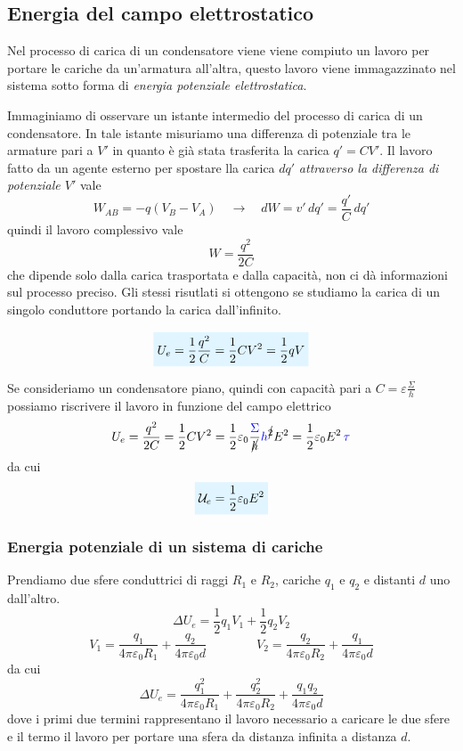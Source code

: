 \documentclass[x11names]{report}
\newcommand{\viola}[1]{%
	\colorbox{myblue}{$\displaystyle #1$}
}
\begin{document}
\subsection{Energia del campo elettrostatico}
Nel processo di carica di un condensatore viene viene compiuto un lavoro per portare le cariche da un'armatura all'altra, questo lavoro viene immagazzinato nel sistema sotto forma di \textit{energia potenziale elettrostatica}.

Immaginiamo di osservare un istante intermedio del processo di carica di un condensatore. In tale istante misuriamo una differenza di potenziale tra le armature pari a \(V'\) in quanto è già stata trasferita la carica \(q' = CV'\). Il lavoro fatto da un agente esterno per spostare lla carica \(dq'\) \textit{attraverso la differenza di potenziale \(V'\)} vale
\[
W_{AB} = -q(V_B-V_A) \quad \to \quad dW = v'\, dq' = \frac{q'}{C}\, dq'
\]
quindi il lavoro complessivo vale
\[
W = \frac{q^2}{2C}
\]
che dipende solo dalla carica trasportata e dalla capacità, non ci dà informazioni sul processo preciso. Gli stessi risutlati si ottengono se studiamo la carica di un singolo conduttore portando la carica dall'infinito.

\begin{equation}
	\viola{U_e = \frac{1}{2}\frac{q^2}{C} = \frac{1}{2}CV^2 = \frac{1}{2}qV}
\end{equation}

Se consideriamo un condensatore piano, quindi con capacità pari a \(C=\varepsilon\frac{\Sigma}{h}\) possiamo riscrivere il lavoro in funzione del campo elettrico
\[
U_e = \frac{q^2}{2C}  = \frac{1}{2}CV^2 =  \frac{1}{2}\varepsilon_0\frac{\textcolor{blue}{\Sigma}}{\cancel{h}}\textcolor{blue}{h}^{\cancel{2}}E^2 = \frac{1}{2}\varepsilon_0 E^2 \, \textcolor{blue}{\tau}
\]
da cui
\begin{equation}
	\viola{\mathcal{U}_e = \frac{1}{2}\varepsilon_0 E^2}
\end{equation}

\subsubsection{Energia potenziale di un sistema di cariche}
Prendiamo due sfere conduttrici di raggi \(R_1\) e \(R_2\), cariche \(q_1\) e \(q_2\) e  distanti \(d\) uno dall'altro.
\[
	\Delta U_e = \frac{1}{2}q_1V_1 + \frac{1}{2}q_2V_2
\]
\[
 V_1 = \frac{q_1}{4\pi \varepsilon_0 R_1} + \frac{q_2}{4\pi \varepsilon_0 d} \qquad \qquad V_2 = \frac{q_2}{4\pi \varepsilon_0 R_2} + \frac{q_1}{4\pi \varepsilon_0 d}
\]
da cui
\[
	\Delta U_e = \frac{q_1^2}{4\pi \varepsilon_0 R_1} + \frac{q_2^2}{4\pi \varepsilon_0 R_2} +\frac{q_1q_2}{4\pi \varepsilon_0 d} 
\]
dove i primi due termini rappresentano il lavoro necessario a caricare le due sfere e il termo il lavoro per portare una sfera da distanza infinita a distanza \(d\).
\end{document}

